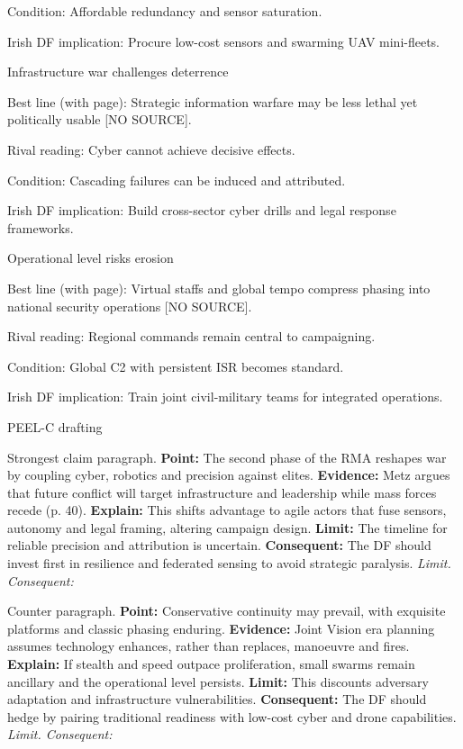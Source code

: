 Condition: Affordable redundancy and sensor saturation.

Irish DF implication: Procure low-cost sensors and swarming UAV mini-fleets.

Infrastructure war challenges deterrence

Best line (with page): Strategic information warfare may be less lethal yet politically usable [NO SOURCE].

Rival reading: Cyber cannot achieve decisive effects.

Condition: Cascading failures can be induced and attributed.

Irish DF implication: Build cross-sector cyber drills and legal response frameworks.

Operational level risks erosion

Best line (with page): Virtual staffs and global tempo compress phasing into national security operations [NO SOURCE].

Rival reading: Regional commands remain central to campaigning.

Condition: Global C2 with persistent ISR becomes standard.

Irish DF implication: Train joint civil-military teams for integrated operations.

PEEL-C drafting

Strongest claim paragraph.
\textbf{Point:} The second phase of the RMA reshapes war by coupling cyber, robotics and precision against elites.
\textbf{Evidence:} Metz argues that future conflict will target infrastructure and leadership while mass forces recede (p. 40).
\textbf{Explain:} This shifts advantage to agile actors that fuse sensors, autonomy and legal framing, altering campaign design.
\textbf{Limit:} The timeline for reliable precision and attribution is uncertain.
\textbf{Consequent:} The DF should invest first in resilience and federated sensing to avoid strategic paralysis. \textit{Limit. Consequent:}

Counter paragraph.
\textbf{Point:} Conservative continuity may prevail, with exquisite platforms and classic phasing enduring.
\textbf{Evidence:} Joint Vision era planning assumes technology enhances, rather than replaces, manoeuvre and fires.
\textbf{Explain:} If stealth and speed outpace proliferation, small swarms remain ancillary and the operational level persists.
\textbf{Limit:} This discounts adversary adaptation and infrastructure vulnerabilities.
\textbf{Consequent:} The DF should hedge by pairing traditional readiness with low-cost cyber and drone capabilities. \textit{Limit. Consequent:}

